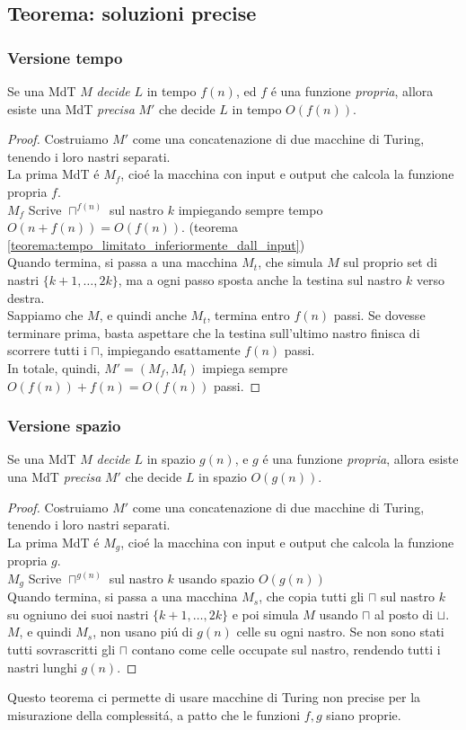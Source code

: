 \subsection{Teorema: soluzioni precise}
\subsubsection{Versione tempo}
Se una MdT $M$ \textit{decide} $L$ in tempo $f(n)$, ed $f$ é una funzione \textit{propria}, allora esiste una MdT \textit{precisa} $M'$ che decide $L$ in tempo $O(f(n))$.
\begin{proof}
Costruiamo $M'$ come una concatenazione di due macchine di Turing, tenendo i loro nastri separati. \\
La prima MdT é $M_f$, cioé la macchina con input e output che calcola la funzione propria $f$. \\
$M_f$ Scrive $\sqcap^{f(n)}$ sul nastro $k$  impiegando sempre tempo $O(n + f(n)) = O(f(n))$. (teorema \ref{teorema:tempo_limitato_inferiormente_dall_input})\\
Quando termina, si passa a una macchina $M_t$, che simula $M$ sul proprio set di nastri $\{k+1, \dots, 2k\}$, ma a ogni passo sposta anche la testina sul nastro $k$ verso destra. \\
Sappiamo che $M$, e quindi anche $M_t$, termina entro $f(n)$ passi. Se dovesse terminare prima, basta aspettare che la testina sull'ultimo nastro finisca di scorrere tutti i $\sqcap$, impiegando esattamente $f(n)$ passi. \\
In totale, quindi, $M' = (M_f, M_t)$ impiega sempre $O(f(n)) + f(n) = O(f(n))$ passi.
\end{proof}

\subsubsection{Versione spazio}
Se una MdT $M$ \textit{decide} $L$ in spazio $g(n)$, e $g$ é una funzione \textit{propria}, allora esiste una MdT \textit{precisa} $M'$ che decide $L$ in spazio $O(g(n))$.
\begin{proof}
Costruiamo $M'$ come una concatenazione di due macchine di Turing, tenendo i loro nastri separati. \\
La prima MdT é $M_g$, cioé la macchina con input e output che calcola la funzione propria $g$. \\
$M_g$ Scrive $\sqcap^{g(n)}$ sul nastro $k$  usando spazio $O(g(n))$ \\
Quando termina, si passa a una macchina $M_s$, che copia tutti gli $\sqcap$ sul nastro $k$ su ogniuno dei suoi nastri $\{k+1, \dots, 2k\}$ e poi simula $M$ usando $\sqcap$ al posto di $\sqcup$. \\
$M$, e quindi $M_s$, non usano piú di $g(n)$ celle su ogni nastro. Se non sono stati tutti sovrascritti gli $\sqcap$ contano come celle occupate sul nastro, rendendo tutti i nastri lunghi $g(n)$.
\end{proof}

Questo teorema ci permette di usare macchine di Turing non precise per la misurazione della complessitá, a patto che le funzioni $f, g$ siano proprie.





